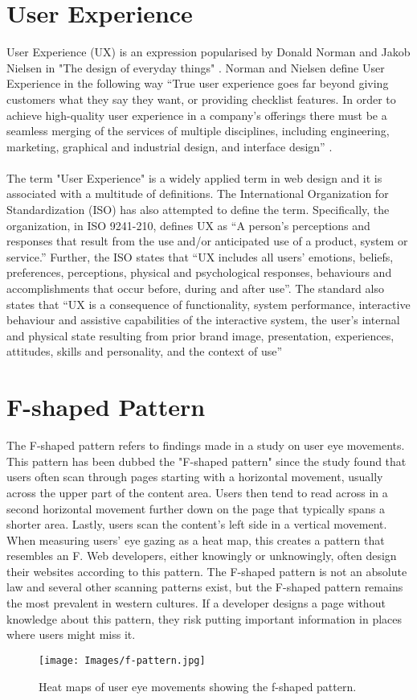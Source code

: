 \section{User Experience}
User Experience (UX) is an expression popularised by Donald Norman and Jakob Nielsen in "The design of everyday things" \cite{Norman}. Norman and Nielsen define User Experience in the following way “True user experience goes far beyond giving customers what they say they want, or providing checklist features. In order to achieve high-quality user experience in a company’s offerings there must be a seamless merging of the services of multiple disciplines, including engineering, marketing, graphical and industrial design, and interface design” \cite{Norman} . 
\\\\
The term "User Experience" is a widely applied term in web design and it is associated with a multitude of definitions. The International Organization for Standardization (ISO) has also attempted to define the term. Specifically, the organization, in ISO 9241-210, defines UX as “A person's perceptions and responses that result from the use and/or anticipated use of a product, system or service.” Further, the ISO states that “UX includes all users' emotions, beliefs, preferences, perceptions, physical and psychological responses, behaviours and accomplishments that occur before, during and after use”. The standard also states that “UX is a consequence of functionality, system performance, interactive behaviour and assistive capabilities of the interactive system, the user's internal and physical state resulting from prior brand image, presentation, experiences, attitudes, skills and personality, and the context of use” 

\section{F-shaped Pattern}
The F-shaped pattern refers to findings made in a study on user eye movements.\cite{pernice2014people} This pattern has been dubbed the "F-shaped pattern" since the study found that users often scan through pages starting with a horizontal movement, usually across the upper part of the content area. Users then tend to read across in a second horizontal movement further down on the page that typically spans a shorter area. Lastly, users scan the content’s left side in a vertical movement. When measuring users' eye gazing as a heat map, this creates a pattern that resembles an F. Web developers, either knowingly or unknowingly, often design their websites according to this pattern. The F-shaped pattern is not an absolute law and several other scanning patterns exist, but the F-shaped pattern remains the most prevalent in western cultures. \cite{f-shape_today} If a developer designs a page without knowledge about this pattern, they risk putting important information in places where users might miss it. 
\begin{figure}[h]
	\centering
	\texttt{[image: Images/f-pattern.jpg]}
	\decoRule
	\caption[F-Shaped Pattern]{Heat maps of user eye movements showing the f-shaped pattern. }
	\label{fig:f-hape}
\end{figure}


